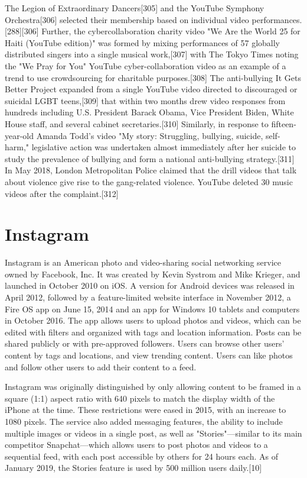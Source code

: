 \documentclass[12pt]{article}
\begin{document}
The Legion of Extraordinary Dancers[305] and the YouTube Symphony Orchestra[306] selected their membership based on individual video performances.[288][306] Further, the cybercollaboration charity video "We Are the World 25 for Haiti (YouTube edition)" was formed by mixing performances of 57 globally distributed singers into a single musical work,[307] with The Tokyo Times noting the "We Pray for You" YouTube cyber-collaboration video as an example of a trend to use crowdsourcing for charitable purposes.[308] The anti-bullying It Gets Better Project expanded from a single YouTube video directed to discouraged or suicidal LGBT teens,[309] that within two months drew video responses from hundreds including U.S. President Barack Obama, Vice President Biden, White House staff, and several cabinet secretaries.[310] Similarly, in response to fifteen-year-old Amanda Todd's video "My story: Struggling, bullying, suicide, self-harm," legislative action was undertaken almost immediately after her suicide to study the prevalence of bullying and form a national anti-bullying strategy.[311] In May 2018, London Metropolitan Police claimed that the drill videos that talk about violence give rise to the gang-related violence. YouTube deleted 30 music videos after the complaint.[312] 




\section{Instagram}



Instagram is an American photo and video-sharing social networking service owned by Facebook, Inc. It was created by Kevin Systrom and Mike Krieger, and launched in October 2010 on iOS. A version for Android devices was released in April 2012, followed by a feature-limited website interface in November 2012, a Fire OS app on June 15, 2014 and an app for Windows 10 tablets and computers in October 2016. The app allows users to upload photos and videos, which can be edited with filters and organized with tags and location information. Posts can be shared publicly or with pre-approved followers. Users can browse other users' content by tags and locations, and view trending content. Users can like photos and follow other users to add their content to a feed.

Instagram was originally distinguished by only allowing content to be framed in a square (1:1) aspect ratio with 640 pixels to match the display width of the iPhone at the time. These restrictions were eased in 2015, with an increase to 1080 pixels. The service also added messaging features, the ability to include multiple images or videos in a single post, as well as "Stories"—similar to its main competitor Snapchat—which allows users to post photos and videos to a sequential feed, with each post accessible by others for 24 hours each. As of January 2019, the Stories feature is used by 500 million users daily.[10]
\end{document}
